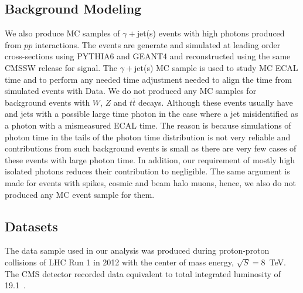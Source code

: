 \subsection{Background Modeling}
We also produce  MC samples of $\gamma +$jet(s) events with high \pt photons produced from  $pp$ interactions. The events are generate and simulated at leading order cross-sections using \textsf{PYTHIA6} and \textsf{GEANT4} and reconstructed using the same CMSSW release for signal.
The $\gamma +$jet(s) MC sample is used to study MC ECAL time and to perform any needed time adjustment needed to align the time from simulated events with Data. 
\newline
We do not produced any MC samples for background events with $W$, $Z$ and $t\bar{t}$ decays. Although these events usually have \MET and jets with a  possible large time photon in the case where a jet misidentified as a photon with a mismeasured ECAL time. The reason is because simulations of photon time in the tails of the photon time distribution is not very reliable and contributions from such background events is small as there are very few cases of these events with large photon time. In addition, our requirement of mostly high \pt isolated photons reduces their contribution to negligible. The same argument is made for events with spikes, cosmic and beam halo muons, hence, we also do not produced any MC event sample for them.
\subsection{Datasets}
The data sample used in our analysis was produced during proton-proton collisions of LHC Run 1 in 2012 with the center of mass energy, $\sqrt{S} = 8$~TeV. The CMS detector recorded data equivalent to total integrated luminosity of 19.1~\fbinv .
